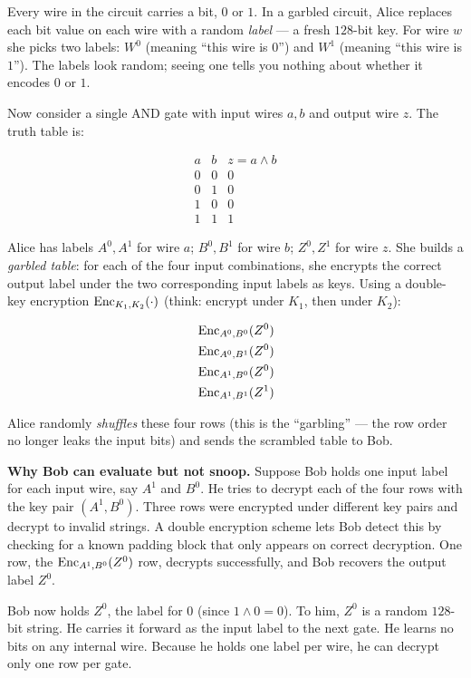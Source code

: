 Every wire in the circuit carries a bit, $0$ or $1$. In a garbled circuit, Alice replaces each bit value on each wire with a random \emph{label} --- a fresh $128$-bit key. For wire $w$ she picks two labels: $W^0$ (meaning ``this wire is $0$'') and $W^1$ (meaning ``this wire is $1$''). The labels look random; seeing one tells you nothing about whether it encodes $0$ or $1$.

Now consider a single AND gate with input wires $a, b$ and output wire $z$. The truth table is:

\[
\begin{array}{cc|c}
a & b & z = a \land b \\\hline
0 & 0 & 0 \\
0 & 1 & 0 \\
1 & 0 & 0 \\
1 & 1 & 1
\end{array}
\]

Alice has labels $A^0, A^1$ for wire $a$; $B^0, B^1$ for wire $b$; $Z^0, Z^1$ for wire $z$. She builds a \emph{garbled table}: for each of the four input combinations, she encrypts the correct output label under the two corresponding input labels as keys. Using a double-key encryption $\operatorname{Enc}_{K_1, K_2}(\cdot)$ (think: encrypt under $K_1$, then under $K_2$):

\[
\begin{aligned}
&\operatorname{Enc}_{A^0, B^0}(Z^0) \\
&\operatorname{Enc}_{A^0, B^1}(Z^0) \\
&\operatorname{Enc}_{A^1, B^0}(Z^0) \\
&\operatorname{Enc}_{A^1, B^1}(Z^1)
\end{aligned}
\]

Alice randomly \emph{shuffles} these four rows (this is the ``garbling'' --- the row order no longer leaks the input bits) and sends the scrambled table to Bob.

\begin{whybox}
\textbf{Why Bob can evaluate but not snoop.} Suppose Bob holds one input label for each input wire, say $A^1$ and $B^0$. He tries to decrypt each of the four rows with the key pair $(A^1, B^0)$. Three rows were encrypted under different key pairs and decrypt to invalid strings. A double encryption scheme lets Bob detect this by checking for a known padding block that only appears on correct decryption. One row, the $\operatorname{Enc}_{A^1,B^0}(Z^0)$ row, decrypts successfully, and Bob recovers the output label $Z^0$.

Bob now holds $Z^0$, the label for $0$ (since $1 \land 0 = 0$). To him, $Z^0$ is a random $128$-bit string. He carries it forward as the input label to the next gate. He learns no bits on any internal wire. Because he holds one label per wire, he can decrypt only one row per gate.
\end{whybox}

